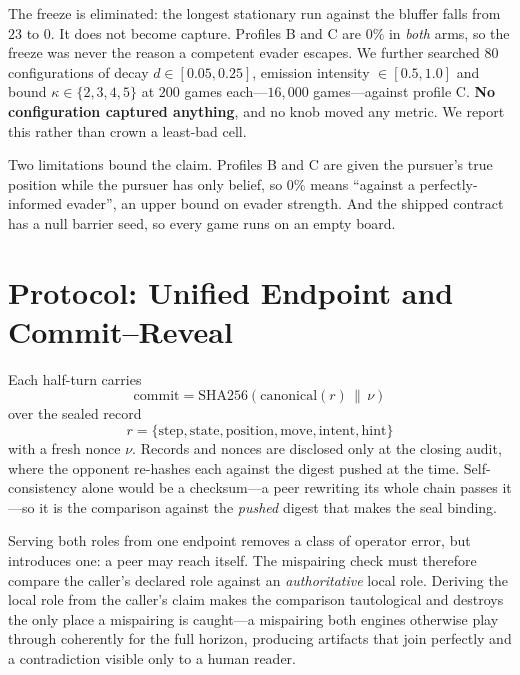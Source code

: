 \documentclass[conference]{IEEEtran}
\begin{document}
The freeze is eliminated: the longest stationary run against the bluffer falls
from $23$ to $0$. It does not become capture. Profiles B and C are $0\%$ in
\emph{both} arms, so the freeze was never the reason a competent evader
escapes. We further searched $80$ configurations of decay
$d\in[0.05,0.25]$, emission intensity $\in[0.5,1.0]$ and bound
$\kappa\in\{2,3,4,5\}$ at $200$ games each---$16{,}000$ games---against
profile C. \textbf{No configuration captured anything}, and no knob moved any
metric. We report this rather than crown a least-bad cell.

Two limitations bound the claim. Profiles B and C are given the pursuer's true
position while the pursuer has only belief, so $0\%$ means ``against a
perfectly-informed evader'', an upper bound on evader strength. And the
shipped contract has a null barrier seed, so every game runs on an empty
board.

\section{Protocol: Unified Endpoint and Commit--Reveal}

Each half-turn carries
\begin{equation}
\mathrm{commit} = \mathrm{SHA256}\!\left(
\mathrm{canonical}(r) \,\|\, \nu \right)
\end{equation}
over the sealed record
\begin{equation}
r = \{\text{step}, \text{state}, \text{position}, \text{move},
\text{intent}, \text{hint}\}
\end{equation}
with a fresh nonce $\nu$. Records and nonces are disclosed only at the
closing audit, where the opponent re-hashes each against
the digest pushed at the time. Self-consistency alone would be a checksum---a
peer rewriting its whole chain passes it---so it is the comparison against the
\emph{pushed} digest that makes the seal binding.

Serving both roles from one endpoint removes a class of operator error, but
introduces one: a peer may reach itself. The mispairing check must therefore
compare the caller's declared role against an \emph{authoritative} local role.
Deriving the local role from the caller's claim makes the comparison
tautological and destroys the only place a mispairing is caught---a
mispairing both engines otherwise play through coherently for the full
horizon, producing artifacts that join perfectly and a contradiction visible
only to a human reader.
\end{document}

